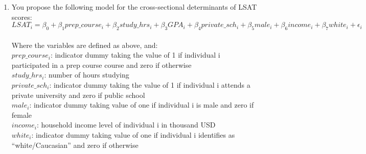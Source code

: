 \documentclass[12pt]{article}
\begin{document}
\begin{enumerate}[(1)]
\\
\\
\\
\pagebreak
\item You propose the following model for the cross-sectional determinants of LSAT scores:\\
$LSAT_i = \beta_0 + \beta_1 prep\_course_i + \beta_2study\_hrs_i + \beta_3GPA_i + \beta_4 private\_sch_i + \beta_5male_i + \beta_6income_i + \beta_7white_i + \epsilon_i$\\
\\
Where the variables are defined as above, and:\\
$prep\_course_i$: indicator dummy taking the value of 1 if individual i participated in a prep course course and zero if otherwise\\
$study\_hrs_i$: number of hours studying\\
$private\_sch_i$: indicator dummy taking the value of 1 if individual i attends a private university and zero if public school\\
$male_i$: indicator dummy taking value of one if individual i is male and zero if female\\
$income_i$: household income level of individual i in thousand USD\\
$white_i$: indicator dummy taking value of one if individual i identifies as “white/Caucasian” and zero if otherwise




\end{enumerate}
\end{document}
